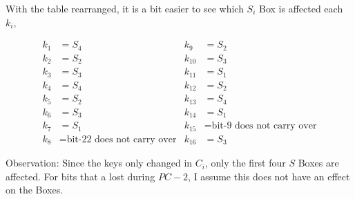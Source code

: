 \documentclass[12pt]{article}
\begin{document}
\begin{enumerate}
\begin{enumerate}
			With the table rearranged, it is a bit easier to see which $S_i$ Box is affected each $k_i$,
			
			\begin{align*}
			k_1 &= S_{4} & k_9 &= S_{2}\\
			k_2 &= S_{2} & k_{10} &= S_{3}\\
			k_3 &= S_{3} & k_{11} &= S_{1}\\
			k_4 &= S_{4} & k_{12} &= S_{2}\\
			k_5 &= S_{2} & k_{13} &= S_{4}\\
			k_6 &= S_{3} & k_{14} &= S_{1}\\
			k_7 &= S_{1} & k_{15} &= \text{bit-9 does not carry over}\\
			k_8 &= \text{bit-22 does not carry over} & k_{16} &= S_{3}
			\end{align*}
			
			Observation: Since the keys only changed in $C_i$, only the first four $S$ Boxes are affected. For bits that a lost during $PC-2$, I assume this does not have an effect on the Boxes. 
		\end{enumerate}
	\end{enumerate}
\end{document}
